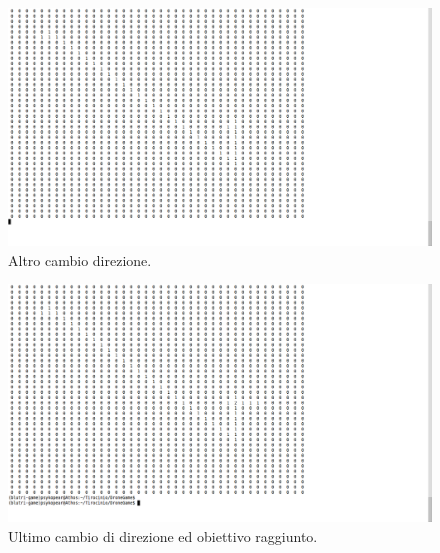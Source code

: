 \begin{figure}[hb]
\center
\includegraphics[width=\textwidth]{immagini/Run7.png}
\caption{Altro cambio direzione.}
\end{figure}

\begin{figure}[hb]
\center
\includegraphics[width=\textwidth]{immagini/Run8.png}
\caption{Ultimo cambio di direzione ed obiettivo raggiunto.}
\end{figure}